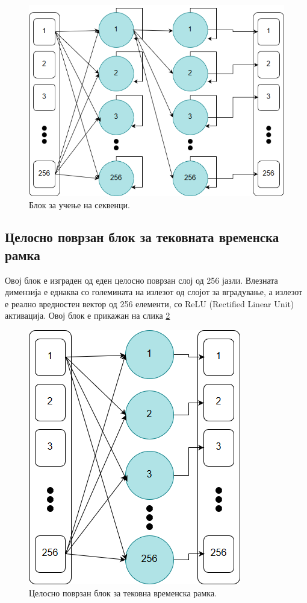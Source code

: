 \begin{figure}[H]
	\centering
    \includegraphics[scale=0.5]{images/lstm_block.png}
	\caption{Блок за учење на секвенци.}
	\label{fig:lstm_block}
\end{figure}

\subsection{Целосно поврзан блок за тековната временска рамка}

Овој блок е изграден од еден целосно поврзан слој од 256 јазли. Влезната димензија е еднаква со големината на излезот од слојот за вградување, а излезот е реално вредностен вектор од 256 елементи, со ReLU (Rectified Linear Unit) активација. Овој блок е прикажан на слика \ref{fig:fully_connected_block}

\begin{figure}[H]
	\centering
    \includegraphics[scale=0.5]{images/fully_connected.png}
	\caption{Целосно поврзан блок за тековна временска рамка.}
	\label{fig:fully_connected_block}
\end{figure}

